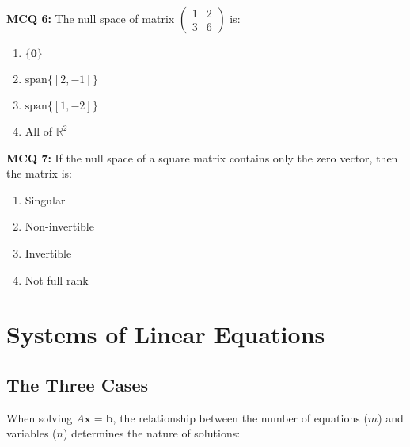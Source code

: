 \documentclass[11pt,a4paper]{article}
\theoremstyle{definition}
\begin{document}
\noindent \textbf{MCQ 6:} The null space of matrix $\begin{pmatrix} 1 & 2 \\ 3 & 6 \end{pmatrix}$ is:

\begin{enumerate}
    \item $\{\mathbf{0}\}$
    \item $\text{span}\{[2, -1]\}$
    \item $\text{span}\{[1, -2]\}$
    \item All of $\mathbb{R}^2$
\end{enumerate}

\noindent \textbf{MCQ 7:} If the null space of a square matrix contains only the zero vector, then the matrix is:

\begin{enumerate}
    \item Singular
    \item Non-invertible
    \item Invertible
    \item Not full rank
\end{enumerate}

\section{Systems of Linear Equations}

\subsection{The Three Cases}

When solving $A\mathbf{x} = \mathbf{b}$, the relationship between the number of equations ($m$) and variables ($n$) determines the nature of solutions:
\end{document}
